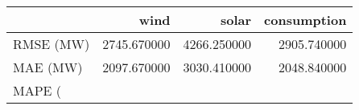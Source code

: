 \begin{tabular}{lrrr}
\toprule
 & wind & solar & consumption \\
\midrule
RMSE (MW) & 2745.670000 & 4266.250000 & 2905.740000 \\
MAE (MW) & 2097.670000 & 3030.410000 & 2048.840000 \\
MAPE (%
\bottomrule
\end{tabular}
